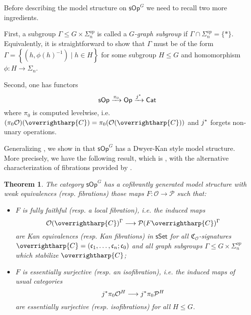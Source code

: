 \documentclass[a4paper,10pt]{article}%
\numberwithin{equation}{section}
\numberwithin{figure}{section}
\newtheorem{theorem}[equation]{Theorem}%
\theoremstyle{definition} %
\newcommand{\sets}[2]{\left\{ #1 \;|\; #2\right\}}%
\newcommand{\longto}{\longrightarrow}%
\newcommand{\vect}[1]{\text{\overrightharp{\ensuremath{#1}}}}
\newcommand{\sSet}{\ensuremath{\mathsf{sSet}}}%
\newcommand{\sOp}{\ensuremath{\mathsf{sOp}}}%
\renewcommand{\O}{\ensuremath{\mathcal O}}
\renewcommand{\P}{\ensuremath{\mathcal P}}
\newcommand{\1}{\ensuremath{\mathbbm 1}}%
\begin{document}
Before describing the model structure on $\mathsf{sOp}^G$
we need to recall two more ingredients.

First, 
a subgroup $\Gamma \leq G \times \Sigma_n^{op}$
is called a \emph{$G$-graph subgroup}
if $\Gamma \cap \Sigma_n^{op} = \{*\}$.
Equivalently, it is straightforward to show
that $\Gamma$ must be of the form 
$\Gamma = \sets{(h,\phi(h)^{-1})}{h \in H}$
for some subgroup $H \leq G$
and homomorphism $\phi \colon H \to \Sigma_n$.

Second, one has functors
\[
	\mathsf{sOp} \xrightarrow{\pi_0}
	\mathsf{Op} \xrightarrow{j^{\**}}
	\mathsf{Cat}
\]
where $\pi_0$ is computed levelwise,
i.e. 
$(\pi_0 \O)(\vect{C}) = 
\pi_0(\O(\vect{C}))$
and
$j^{\**}$ forgets non-unary operations.


Generalizing \cite{Ber07b,CM13b},
we show in \cite{BP_HGOP}
that $\mathsf{sOp}^G$ 
has a Dwyer-Kan style model structure.
More precisely, we have the following result, which is
\cite[Thm. III]{BP_HGOP},
with the alternative characterization of fibrations 
provided by 
\cite[Prop. 4.78]{BP_HGOP}.



\begin{theorem}\label{SOPG_THM}
      The category $\sOp^G$ has a cofibrantly generated model structure with weak equivalences (resp. fibrations) those maps
      $F \colon \O \to \P$ such that:
\begin{itemize}
\item $F$ is \emph{fully faithful} (resp. a \emph{local fibration}), i.e. the induced maps
	\begin{equation}\label{DKEQUIV_EQ}
		\O ( \vect{C})^\Gamma \longto 
		\P(F \vect{C})^\Gamma
	\end{equation}
	are Kan equivalences (resp. Kan fibrations) in $\sSet$
	for all $\mathfrak C_\O$-signatures $\vect C = (\mathfrak c_1, \dots, \mathfrak c_n; \mathfrak c_0)$
	and all graph subgroups $\Gamma \leq G \times \Sigma_n^{op}$ which stabilize $\vect C$;
\item $F$ is \emph{essentially surjective} (resp. an \emph{isofibration}), i.e. the induced maps of usual categories
	\begin{equation}\label{ESSSURJ EQ}
		j^{\**}\pi_0 \O^H \longto j^{\**}\pi_0 \P^H
	\end{equation}
	are essentially surjective (resp. isofibrations) for all $H \leq G$.
\end{itemize}
\end{theorem}
\end{document}
